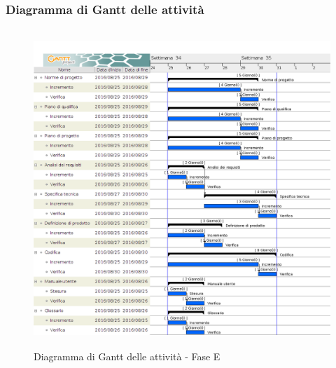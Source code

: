 		\subsubsection{Diagramma di Gantt delle attività}
		
		\begin{figure}[!h]
			\centering
			\includegraphics[height=12cm, width=15cm]{img/gantt/RD} 
			\caption{Diagramma di Gantt delle attività - Fase E}
		\end{figure}
		

